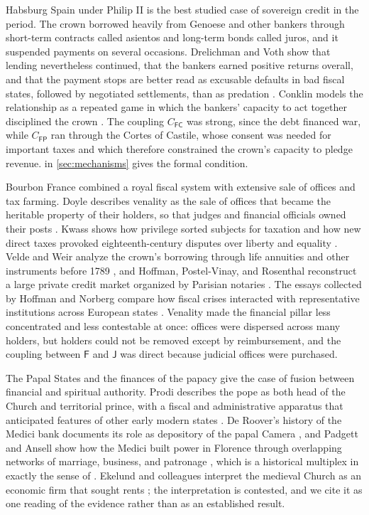 \documentclass[11pt,letterpaper]{article}
\theoremstyle{definition}
\theoremstyle{remark}
\newcommand{\pF}{\mathsf{F}}
\newcommand{\pP}{\mathsf{P}}
\newcommand{\pJ}{\mathsf{J}}
\newcommand{\pC}{\mathsf{C}}
\begin{document}
Habsburg Spain under Philip II is the best studied case of sovereign credit in the period. The crown borrowed heavily from Genoese and other bankers through short-term contracts called asientos and long-term bonds called juros, and it suspended payments on several occasions. Drelichman and Voth show that lending nevertheless continued, that the bankers earned positive returns overall, and that the payment stops are better read as excusable defaults in bad fiscal states, followed by negotiated settlements, than as predation \citep{drelichman2011,drelichman2014}. Conklin models the relationship as a repeated game in which the bankers' capacity to act together disciplined the crown \citep{conklin1998}. The coupling $C_{\pF\pC}$ was strong, since the debt financed war, while $C_{\pF\pP}$ ran through the Cortes of Castile, whose consent was needed for important taxes and which therefore constrained the crown's capacity to pledge revenue.  in \cref{sec:mechanisms} gives the formal condition.

Bourbon France combined a royal fiscal system with extensive sale of offices and tax farming. Doyle describes venality as the sale of offices that became the heritable property of their holders, so that judges and financial officials owned their posts \citep{doyle1996}. Kwass shows how privilege sorted subjects for taxation and how new direct taxes provoked eighteenth-century disputes over liberty and equality \citep{kwass2000}. Velde and Weir analyze the crown's borrowing through life annuities and other instruments before 1789 \citep{velde1992}, and Hoffman, Postel-Vinay, and Rosenthal reconstruct a large private credit market organized by Parisian notaries \citep{hoffman2000}. The essays collected by Hoffman and Norberg compare how fiscal crises interacted with representative institutions across European states \citep{hoffmannorberg1994}. Venality made the financial pillar less concentrated and less contestable at once: offices were dispersed across many holders, but holders could not be removed except by reimbursement, and the coupling between $\pF$ and $\pJ$ was direct because judicial offices were purchased.

The Papal States and the finances of the papacy give the case of fusion between financial and spiritual authority. Prodi describes the pope as both head of the Church and territorial prince, with a fiscal and administrative apparatus that anticipated features of other early modern states \citep{prodi1987}. De Roover's history of the Medici bank documents its role as depository of the papal Camera \citep{deroover1963}, and Padgett and Ansell show how the Medici built power in Florence through overlapping networks of marriage, business, and patronage \citep{padgett1993}, which is a historical multiplex in exactly the sense of \citet{largo2026hbs}. Ekelund and colleagues interpret the medieval Church as an economic firm that sought rents \citep{ekelund1996}; the interpretation is contested, and we cite it as one reading of the evidence rather than as an established result.
\end{document}
